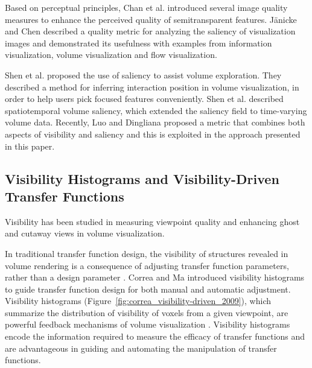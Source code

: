 \documentclass{egpubl}
\begin{document}
Based on perceptual principles, Chan et al. \cite{chan_perception-based_2009} introduced several image quality measures to enhance the perceived quality of semitransparent features.
J{\"a}nicke and Chen \cite{janicke_salience-based_2010} described a quality metric for analyzing the saliency of visualization images and demonstrated its usefulness with examples from information visualization, volume visualization and flow visualization.

Shen et al. \cite{shen_save:_2014} proposed the use of saliency to assist volume exploration. They described a method for inferring interaction position in volume visualization, in order to help users pick focused features conveniently.
Shen et al. \cite{shen_spatiotemporal_2015} described spatiotemporal volume saliency, which extended the saliency field \cite{kim_saliency-guided_2006} to time-varying volume data. Recently, Luo and Dingliana \cite{luo_visibility-weighted_2015} proposed a metric that combines both aspects of visibility and saliency and this is exploited in the approach presented in this paper.  

\subsection{Visibility Histograms and Visibility-Driven Transfer Functions}
Visibility has been studied in measuring viewpoint quality \cite{bordoloi_view_2005} and enhancing ghost and cutaway views \cite{viola_importance-driven_2004} in volume visualization.

In traditional transfer function design, the visibility of structures revealed in volume rendering is a consequence of adjusting transfer function parameters, rather than a design parameter \cite{preim_visual_2013}.
Correa and Ma \cite{correa_visibility-driven_2009} introduced visibility histograms to guide transfer function design for both manual and automatic adjustment.
Visibility histograms (Figure~\ref{fig:correa_visibility-driven_2009}), which summarize the distribution of visibility of voxels from a given viewpoint, are powerful feedback mechanisms of volume visualization \cite{emsenhuber_visibility_2008}.
Visibility histograms encode the information required to measure the efficacy of transfer functions and are advantageous in guiding and automating the manipulation of transfer functions.
\end{document}
